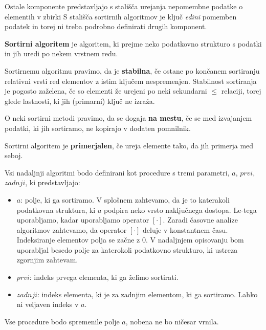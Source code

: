 \documentclass[a4paper,oneside]{article}
\begin{document}
Ostale komponente predstavljajo s stališča urejanja nepomembne podatke o elementih v zbirki
S stališča sortirnih algoritmov je ključ \emph{edini} pomemben podatek in torej ni treba
podrobno definirati drugih komponent.

\begin{definicija}
  \textbf{Sortirni algoritem} je algoritem, ki prejme neko podatkovno strukturo s podatki
  in jih uredi po nekem vrstnem redu.
\end{definicija}

\begin{definicija}
  Sortirnemu algoritmu pravimo, da je \textbf{stabilna}, če ostane po končanem sortiranju
  relativni vrsti red elementov z istim ključem nespremenjen.
  Stabilnost sortiranja je pogosto zaželena, če so elementi že urejeni po neki
  sekundarni $\leq$ relaciji, torej glede lastnosti, ki jih (primarni) ključ ne izraža.
\end{definicija}

\begin{definicija}
  O neki sortirni metodi pravimo, da se dogaja \textbf{na mestu}, če se med izvajanjem podatki, ki
  jih sortiramo, ne kopirajo v dodaten pomnilnik.
\end{definicija}

\begin{definicija}
  Sortirni algoritem je \textbf{primerjalen}, če ureja elemente tako, da jih primerja med seboj.
\end{definicija}


Vsi nadaljnji algoritmi bodo definirani kot procedure s tremi parametri, $a$, $prvi$,
$zadnji$, ki predstavljajo:
\begin{itemize}
  \item $a$: polje, ki ga sortiramo. V splošnem zahtevamo, da je to katerakoli podatkovna
    struktura, ki $a$ podpira neko vrsto naključnega dostopa. Le-tega uporabljamo, kadar 
    uporabljamo operator $[\cdot]$. Zaradi časovne analize algoritmov zahtevamo, da operator 
    $[\cdot]$ deluje v konstantnem času. Indeksiranje elementov polja se začne z 0.
    V nadaljnjem opisovanju bom uporabljal besedo
    polje za katerokoli podatkovno strukturo, ki ustreza zgornjim zahtevam.
  \item $prvi$: indeks prvega elementa, ki ga želimo sortirati.
  \item $zadnji$: indeks elementa, ki je za zadnjim elementom, ki ga sortiramo. Lahko ni
    veljaven indeks v $a$.
\end{itemize}
Vse procedure bodo spremenile polje $a$, nobena ne bo ničesar vrnila.
\end{document}
